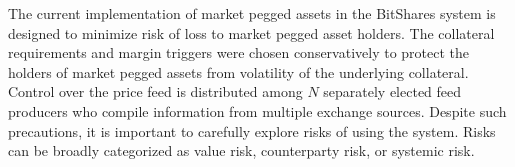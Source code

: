 The current implementation of market pegged assets in the BitShares system is
designed to minimize risk of loss to market pegged asset holders. The
collateral requirements and margin triggers were chosen conservatively to
protect the holders of market pegged assets from volatility of the underlying
collateral. Control over the price feed is distributed among $N$ separately
elected feed producers who compile information from multiple exchange sources.
Despite such precautions, it is important to carefully explore risks of using
the system. Risks can be broadly categorized as value risk, counterparty risk,
or systemic risk.

